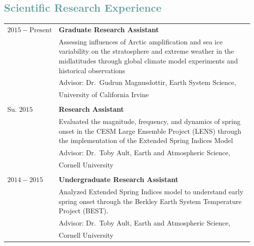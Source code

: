 \documentclass[margin,line,palatino,courier,10pt]{res}
\begin{document}
\begin{resume}
\section{\sc \textcolor{CadetBlue}{\large{Scientific Research Experience}}}
\vspace*{0.05in}
\begin{tabular}{@{}p{0.81in}p{4in}}
$2015 -\text{Present}$ & \textbf{Graduate Research Assistant}\\
& Assessing influences of Arctic amplification and sea ice variability on the stratosphere and extreme weather in the midlatitudes through global climate model experiments and historical observations\\
& \hspace{0.2in} Advisor: Dr.\ Gudrun Magnusdottir, Earth System Science,\\
& \hspace{0.2in} University of California Irvine\\
\\
Su. $2015$ & \textbf{Research Assistant}\\
& Evaluated the magnitude, frequency, and dynamics of spring onset in the CESM Large Ensemble Project (LENS) through the implementation of the Extended Spring Indices Model \\
& \hspace{0.2in} Advisor: Dr.\ Toby Ault, Earth and Atmospheric Science,\\
& \hspace{0.2in} Cornell University\\
\\
$2014-2015$ & \textbf{Undergraduate Research Assistant}\\
& Analyzed Extended Spring Indices model to understand early spring onset through the Berkley Earth System Temperature Project (BEST). \\
& \hspace{0.2in} Advisor: Dr.\ Toby Ault, Earth and Atmospheric Science, \\
& \hspace{0.2in} Cornell University\\
\end{tabular}

\vspace{-0.1in}
\noindent\makebox[\linewidth][r]{\rule{\textwidth}{5pt}}
\vspace{-0.3in}


\end{resume}
\end{document}
